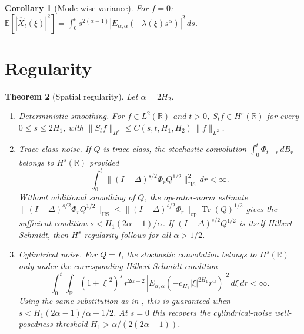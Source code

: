 \documentclass[11pt]{article}
\newtheorem{theorem}{Theorem}[section]
\newtheorem{corollary}[theorem]{Corollary}
\theoremstyle{definition}
\theoremstyle{remark}
\DeclareMathOperator{\Tr}{Tr}
\newcommand{\E}{\mathbb{E}}
\newcommand{\R}{\mathbb{R}}
\newcommand{\norm}[1]{\| #1 \|}
\begin{document}
\begin{corollary}[Mode-wise variance]\label{cor:mode_variance}
For $f = 0$: $\E[|\hat{X}_t(\xi)|^2] = \int_0^t s^{2(\alpha-1)} |E_{\alpha,\alpha}(-\lambda(\xi)s^\alpha)|^2\, ds$.
\end{corollary}

\section{Regularity}\label{sec:regularity}

\begin{theorem}[Spatial regularity]\label{thm:spatial_reg}
Let $\alpha = 2H_2$.
\begin{enumerate}[label=\textnormal{(\alph*)}]
\item \emph{Deterministic smoothing.}  For $f \in L^2(\R)$
and $t > 0$, $S_t f \in H^s(\R)$ for every
$0 \leq s \leq 2H_1$, with
$\norm{S_t f}_{H^s} \leq C(s,t,H_1,H_2)\,\norm{f}_{L^2}$.
\item \emph{Trace-class noise.}  If $Q$ is trace-class,
the stochastic convolution
$\int_0^t \Phi_{t-r}\, dB_r$ belongs to $H^s(\R)$ provided
\begin{equation}\label{eq:spatial_reg_trace}
\int_0^t \norm{(I-\Delta)^{s/2} \Phi_r Q^{1/2}}_{\mathrm{HS}}^2\,
dr < \infty.
\end{equation}
Without additional smoothing of $Q$, the operator-norm
estimate
$\norm{(I-\Delta)^{s/2}\Phi_r Q^{1/2}}_{\mathrm{HS}}
\leq \norm{(I-\Delta)^{s/2}\Phi_r}_{\mathrm{op}}
\Tr(Q)^{1/2}$
gives the sufficient condition
$s < H_1(2\alpha-1)/\alpha$.
If $(I-\Delta)^{s/2} Q^{1/2}$ is itself Hilbert-Schmidt,
then $H^s$ regularity follows for all $\alpha > 1/2$.
\item \emph{Cylindrical noise.}  For $Q = I$, the
stochastic convolution belongs to $H^s(\R)$ only under the
corresponding Hilbert-Schmidt condition
\begin{equation}\label{eq:spatial_reg_cyl}
\int_0^t \int_\R (1+|\xi|^2)^s\, r^{2\alpha-2}\,
|E_{\alpha,\alpha}(-c_{H_1}|\xi|^{2H_1} r^\alpha)|^2\,
d\xi\, dr < \infty.
\end{equation}
Using the same substitution as in
, this is guaranteed when
$s < H_1(2\alpha-1)/\alpha - 1/2$.  At $s = 0$ this
recovers the cylindrical-noise well-posedness threshold
$H_1 > \alpha/(2(2\alpha-1))$.
\end{enumerate}
\end{theorem}
\end{document}
